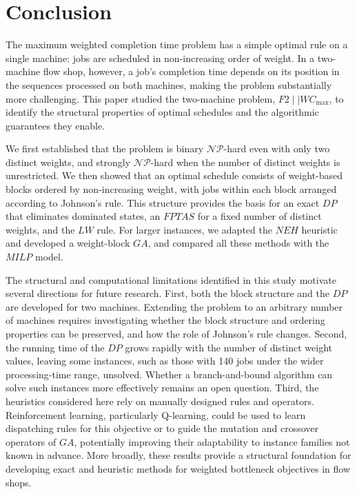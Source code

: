 \documentclass[12pt]{article} \textheight=24.5cm \textwidth=16.5cm \parskip = 0.165cm
\let\origsection\section
\renewcommand{\section}{\FloatBarrier\origsection}
\begin{document}
\begin{sloppypar}
        \section{Conclusion} \label{sec:conclusion}

        The maximum weighted completion time problem has a simple optimal rule on a single machine: jobs are scheduled in non-increasing order of weight. In a two-machine flow shop, however, a job's completion time depends on its position in the sequences processed on both machines, making the problem substantially more challenging.
        This paper studied the two-machine problem, $F2 \mid \mid WC_{\max}$, to identify the structural properties of optimal schedules and the algorithmic guarantees they enable.

        We first established that the problem is binary $\mathcal{NP}$-hard even with only two distinct weights, and strongly $\mathcal{NP}$-hard when the number of distinct weights is unrestricted.
        We then showed that an optimal schedule consists of weight-based blocks ordered by non-increasing weight, with jobs within each block arranged according to Johnson's rule.
        This structure provides the basis for an exact $DP$ that eliminates dominated states, an $FPTAS$ for a fixed number of distinct weights, and the $LW$ rule.
        For larger instances, we adapted the $NEH$ heuristic and developed a weight-block $GA$, and compared all these methods with the $MILP$ model.

        The structural and computational limitations identified in this study motivate several directions for future research.
        First, both the block structure and the $DP$ are developed for two machines. Extending the problem to an arbitrary number of machines requires investigating whether the block structure and ordering properties can be preserved, and how the role of Johnson's rule changes.
        Second, the running time of the $DP$ grows rapidly with the number of distinct weight values, leaving some instances, such as those with 140 jobs under the wider processing-time range, unsolved. Whether a branch-and-bound algorithm can solve such instances more effectively remains an open question.
        Third, the heuristics considered here rely on manually designed rules and operators. Reinforcement learning, particularly Q-learning, could be used to learn dispatching rules for this objective or to guide the mutation and crossover operators of $GA$, potentially improving their adaptability to instance families not known in advance.
        More broadly, these results provide a structural foundation for developing exact and heuristic methods for weighted bottleneck objectives in flow shops.
                
        
        
        
    \end{sloppypar}
\end{document}
